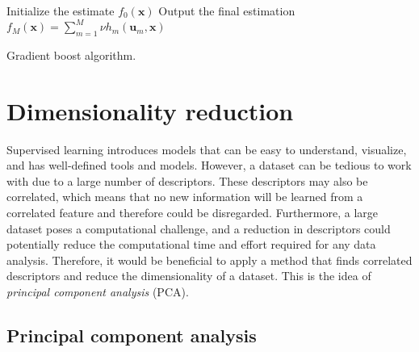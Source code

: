 \begin{algorithm}[H]
\SetAlgoLined
  Initialize the estimate $f_0(\boldsymbol{x})$\;
 Output the final estimation $f_M(\boldsymbol{x}) = \sum_{m=1}^M \nu h_m (\boldsymbol{u}_m, \boldsymbol{x})$
 \caption{Gradient boost algorithm.}
 \label{alg:gradientBoost}
\end{algorithm}

\section{Dimensionality reduction}
Supervised learning introduces models that can be easy to understand, visualize, and has well-defined tools and models. However, a dataset can be tedious to work with due to a large number of descriptors. These descriptors may also be correlated, which means that no new information will be learned from a correlated feature and therefore could be disregarded. Furthermore, a large dataset poses a computational challenge, and a reduction in descriptors could potentially reduce the computational time and effort required for any data analysis. Therefore, it would be beneficial to apply a method that finds correlated descriptors and reduce the dimensionality of a dataset. This is the idea of \textit{principal component analysis} (PCA).


\subsection{Principal component analysis}
\label{pca}

